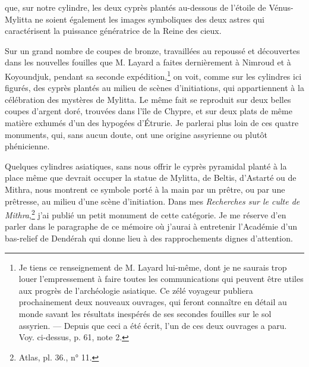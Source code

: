 \documentclass{article}
\begin{document}
que, sur notre cylindre, les deux cyprès plantés au-dessous de l'étoile de Vénus-Mylitta ne soient également les images symboliques des deux astres qui caractérisent la puissance génératrice de la Reine des cieux.

Sur un grand nombre de coupes de bronze, travaillées au repoussé et découvertes dans les nouvelles fouilles que M. Layard a faites dernièrement à Nimroud et à Koyoundjuk, pendant sa seconde expédition,\footnote{Je tiens ce renseignement de M. Layard lui-même, dont je ne saurais trop louer l'empressement à faire toutes les communications qui peuvent être utiles aux progrès de l'archéologie asiatique. Ce zélé voyageur publiera prochainement deux nouveaux ouvrages, qui feront connaître en détail au monde savant les résultats inespérés de ses secondes fouilles sur le sol assyrien. --- Depuis que ceci a été écrit, l'un de ces deux ouvrages a paru. Voy. ci-dessus, p. 61, note 2.} on voit, comme sur les cylindres ici figurés, des cyprès plantés au milieu de scènes d'initiations, qui appartiennent à la célébration des mystères de Mylitta. Le même fait se reproduit sur deux belles coupes d'argent doré, trouvées dans l'île de Chypre, et sur deux plats de même matière exhumés d'un des hypogées d'Étrurie. Je parlerai plus loin de ces quatre monuments, qui, sans aucun doute, ont une origine assyrienne ou plutôt phénicienne.

Quelques cylindres asiatiques, sans nous offrir le cyprès pyramidal planté à la place même que devrait occuper la statue de Mylitta, de Beltis, d'Astarté ou de Mithra, nous montrent ce symbole porté à la main par un prêtre, ou par une prêtresse, au milieu d'une scène d'initiation. Dans mes \emph{Recherches sur le culte de Mithra},\footnote{Atlas, pl. 36., n° 11.} j'ai publié un petit monument de cette catégorie. Je me réserve d'en parler dans le paragraphe de ce mémoire où j'aurai à entretenir l'Académie d'un bas-relief de Dendérah qui donne lieu à des rapprochements dignes d'attention.
\end{document}
